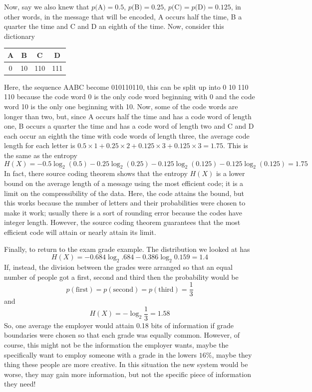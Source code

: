 \documentclass[12pt]{article}
\begin{document}
Now, say we also knew that $p($A$)=0.5$, $p($B$)=0.25$,
$p($C$)=p($D$)=0.125$, in other words, in the message that will be
encoded, A occurs half the time, B a quarter the time and C and D an
eighth of the time. Now, consider this dictionary
\begin{center}
\begin{tabular}{cccc}
A&B&C&D\\
\hline
0&10&110&111
\end{tabular}
\end{center}
Here, the sequence AABC become 010110110, this can be split up into 0
10 110 110 because the code word 0 is the only code word beginning
with 0 and the code word 10 is the only one beginning with 10. Now,
some of the code words are longer than two, but, since A occurs half
the time and has a code word of length one, B occurs a quarter the
time and has a code word of length two and C and D each occur an
eighth the time with code words of length three, the average code
length for each letter is $0.5\times 1 +0.25\times 2 + 0.125\times 3 +
0.125\times 3=1.75$. This is the same as the entropy
\begin{equation}
H(X)=-0.5\log_2(0.5)-0.25\log_2(0.25)-0.125\log_2(0.125)-0.125\log_2(0.125)=1.75
\end{equation}
In fact, there source coding theorem shows that the entropy $H(X)$ is
a lower bound on the average length of a message using the most
efficient code; it is a limit on the compressibility of the
data. Here, the code attains the bound, but this works because the
number of letters and their probabilities were chosen to make it work;
usually there is a sort of rounding error because the codes have
integer length. However, the source coding theorem guarantees that the
most efficient code will attain or nearly attain its limit.


Finally, to return to the exam grade example. The distribution we looked at has
\begin{equation}
H(X)=-0.684\log_2{.684}-0.386\log_2{0.159}=1.4
\end{equation}
If, instead, the division between the grades were arranged so that an equal number of people got a first, second and third then the probability would be 
\begin{equation}
p(\mbox{first})=p(\mbox{second})=p(\mbox{third})=\frac{1}{3}
\end{equation}
and
\begin{equation}
H(X)=-\log_2\frac{1}{3}=1.58
\end{equation}
So, one average the employer would attain 0.18 bits of information if
grade boundaries were chosen so that each grade was equally
common. However, of course, this might not be the information the
employer wants, maybe the specifically want to employ someone with a
grade in the lowers $16\%$, maybe they thing these people are more
creative. In this situation the new system would be worse, they may
gain more information, but not the specific piece of information they
need!


{}
\end{document}
